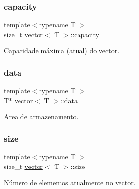 \subsubsection{\texorpdfstring{capacity}{capacity}}
{\footnotesize\ttfamily template$<$typename T $>$ \\
size\+\_\+t \hyperlink{classvector}{vector}$<$ T $>$\+::capacity\hspace{0.3cm}{\ttfamily [private]}}



Capacidade máxima (atual) do vector. 

\mbox{\label{classvector_a7814838e8ff6e26c99a7ae1774fb9188}} 
\subsubsection{\texorpdfstring{data}{data}}
{\footnotesize\ttfamily template$<$typename T $>$ \\
T$\ast$ \hyperlink{classvector}{vector}$<$ T $>$\+::data\hspace{0.3cm}{\ttfamily [private]}}



Area de armazenamento. 

\mbox{\label{classvector_aaa851d34f893e80eb4ffc33e93873d02}} 
\subsubsection{\texorpdfstring{size}{size}}
{\footnotesize\ttfamily template$<$typename T $>$ \\
size\+\_\+t \hyperlink{classvector}{vector}$<$ T $>$\+::size\hspace{0.3cm}{\ttfamily [private]}}



Número de elementos atualmente no vector. 

